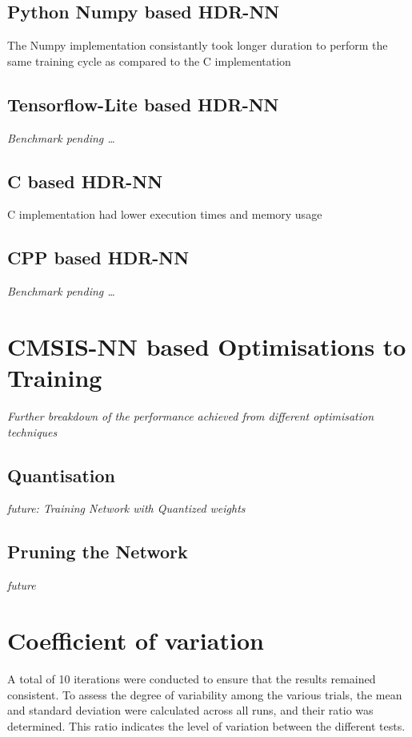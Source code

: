 \subsection[Python - Numpy]{Python Numpy based HDR-NN}

The Numpy implementation consistantly took longer duration to perform the same training cycle as compared to the C implementation

\subsection[Tensorflow Lite]{Tensorflow-Lite based HDR-NN}
\textit{Benchmark pending \dots}

\subsection[C]{C based HDR-NN}

C implementation had lower execution times and memory usage

\subsection[CPP - Eigen]{CPP based HDR-NN}
\textit{Benchmark pending \dots}

\section{CMSIS-NN based Optimisations to Training}
\textit{Further breakdown of the performance achieved from different optimisation techniques}

\subsection{Quantisation}
\textit{future: Training Network with Quantized weights}

\subsection{Pruning the Network}
\textit{future}

\section{Coefficient of variation}
A total of 10 iterations were conducted to ensure that the results remained consistent. To assess the degree of variability among the various trials, the mean and standard deviation were calculated across all runs, and their ratio was determined. This ratio indicates the level of variation between the different tests.


